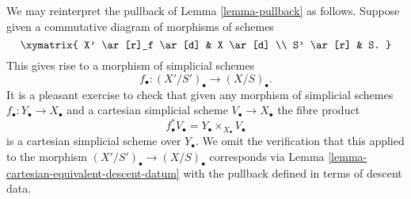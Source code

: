 \noindent
We may reinterpret the pullback of Lemma \ref{lemma-pullback} as follows.
Suppose given a commutative diagram of morphisms of schemes
$$
\xymatrix{
X' \ar[r]_f \ar[d] & X \ar[d] \\
S' \ar[r] & S.
}
$$
This gives rise to a morphism of simplicial schemes
$$
f_\bullet : (X'/S')_\bullet \longrightarrow (X/S)_\bullet.
$$
It is a pleasant exercise to check that given any morphism
of simplicial schemes $f_\bullet : Y_\bullet \to X_\bullet$ and a
cartesian simplicial scheme $V_\bullet \to X_\bullet$
the fibre product
$$
f_\bullet^*V_\bullet = Y_\bullet \times_{X_\bullet} V_\bullet
$$
is a cartesian simplicial scheme over $Y_\bullet$. We omit
the verification that this applied to the morphism
$(X'/S')_\bullet \to (X/S)_\bullet$ corresponds via
Lemma \ref{lemma-cartesian-equivalent-descent-datum}
with the pullback defined in terms of descent data.















